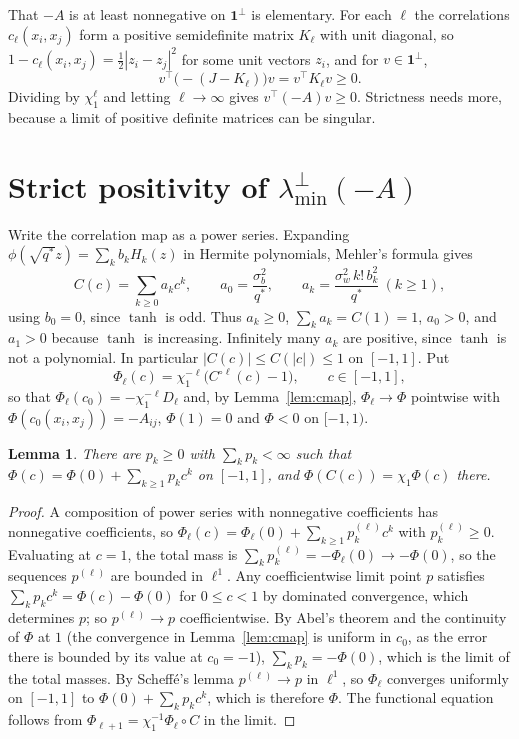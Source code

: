 \documentclass[11pt]{amsart}
\newtheorem{lemma}[theorem]{Lemma}
\theoremstyle{remark}\newtheorem{remark}[theorem]{Remark}
\begin{document}
That $-A$ is at least nonnegative on $\mathbf 1^\perp$ is elementary. For each $\ell$ the correlations $c_\ell(x_i,x_j)$
form a positive semidefinite matrix $K_\ell$ with unit diagonal, so $1-c_\ell(x_i,x_j)=\tfrac12|z_i-z_j|^2$ for some
unit vectors $z_i$, and for $v\in\mathbf 1^\perp$,
\[
v^\top\big(-(J-K_\ell)\big)v=v^\top K_\ell v\ge0 .
\]
Dividing by $\chi_1^\ell$ and letting $\ell\to\infty$ gives $v^\top(-A)v\ge0$. Strictness needs more, because a limit of
positive definite matrices can be singular.

\section{Strict positivity of $\lambda_{\min}^{\perp}(-A)$}\label{sec:positive}
Write the correlation map as a power series. Expanding $\phi(\sqrt{q^*}z)=\sum_kb_kH_k(z)$ in Hermite polynomials,
Mehler's formula gives
\[
C(c)=\sum_{k\ge0}a_kc^k,\qquad a_0=\frac{\sigma_b^2}{q^*},\qquad a_k=\frac{\sigma_w^2\,k!\,b_k^2}{q^*}\ (k\ge1),
\]
using $b_0=0$, since $\tanh$ is odd. Thus $a_k\ge0$, $\sum_ka_k=C(1)=1$, $a_0>0$, and $a_1>0$ because $\tanh$ is
increasing. Infinitely many $a_k$ are positive, since $\tanh$ is not a polynomial. In particular $|C(c)|\le C(|c|)\le1$
on $[-1,1]$. Put
\[
\Phi_\ell(c)=\chi_1^{-\ell}\big(C^{\circ\ell}(c)-1\big),\qquad c\in[-1,1],
\]
so that $\Phi_\ell(c_0)=-\chi_1^{-\ell}D_\ell$ and, by Lemma~\ref{lem:cmap}, $\Phi_\ell\to\Phi$ pointwise with
$\Phi(c_0(x_i,x_j))=-A_{ij}$, $\Phi(1)=0$ and $\Phi<0$ on $[-1,1)$.

\begin{lemma}\label{lem:series}
There are $p_k\ge0$ with $\sum_kp_k<\infty$ such that $\Phi(c)=\Phi(0)+\sum_{k\ge1}p_kc^k$ on $[-1,1]$, and
$\Phi(C(c))=\chi_1\Phi(c)$ there.
\end{lemma}

\begin{proof}
A composition of power series with nonnegative coefficients has nonnegative coefficients, so
$\Phi_\ell(c)=\Phi_\ell(0)+\sum_{k\ge1}p_k^{(\ell)}c^k$ with $p_k^{(\ell)}\ge0$. Evaluating at $c=1$, the total mass is
$\sum_kp_k^{(\ell)}=-\Phi_\ell(0)\to-\Phi(0)$, so the sequences $p^{(\ell)}$ are bounded in $\ell^1$. Any coefficientwise
limit point $p$ satisfies $\sum_kp_kc^k=\Phi(c)-\Phi(0)$ for $0\le c<1$ by dominated convergence, which determines $p$; so
$p^{(\ell)}\to p$ coefficientwise. By Abel's theorem and the continuity of $\Phi$ at $1$ (the convergence in
Lemma~\ref{lem:cmap} is uniform in $c_0$, as the error there is bounded by its value at $c_0=-1$), $\sum_kp_k=-\Phi(0)$,
which is the limit of the total masses. By Scheff\'e's lemma $p^{(\ell)}\to p$ in $\ell^1$, so $\Phi_\ell$ converges
uniformly on $[-1,1]$ to $\Phi(0)+\sum_kp_kc^k$, which is therefore $\Phi$. The functional equation follows from
$\Phi_{\ell+1}=\chi_1^{-1}\Phi_\ell\circ C$ in the limit.
\end{proof}
\end{document}
